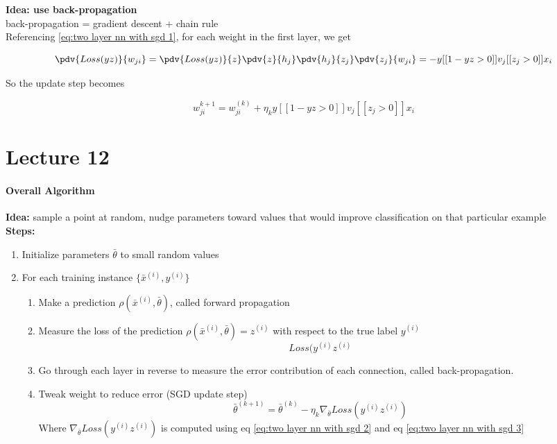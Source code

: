 \documentclass[12pt]{article}
\begin{document}
\textbf{Idea: use back-propagation}\\
back-propagation = gradient descent + chain rule\\

Referencing \ref{eq:two layer nn with sgd 1}, for each weight in the first layer, we get

\begin{equation}
	\pdv{Loss(yz)}{w_{ji}} = \pdv{Loss(yz)}{z} \pdv{z}{h_j} \pdv{h_j}{z_j} \pdv{z_j}{w_{ji}} = -y[[1-yz > 0]] v_j [[z_j > 0]] x_i	\label{eq:two layer nn with sgd 3}
\end{equation}

So the update step becomes

\begin{equation}
	w_{ji}^{k+1} = w_{ji}^{(k)} + \eta_k y[[1-yz > 0]] v_j [[z_j > 0]] x_i
	\label{eq:two layer nn with sgd 4}
\end{equation}

\part{Lecture 12}

\subsection{Overall Algorithm}

\textbf{Idea:} sample a point at random, nudge parameters toward values that would improve classification on that particular example\\

\textbf{Steps:}

\begin{enumerate}
	\item Initialize parameters $\bar{\theta}$ to small random values
	\item For each training instance $\{ \bar x^{(i)}, y^{(i)} \}$
		\begin{enumerate}
			\item Make a prediction $\rho(\bar x^{(i)}, \bar{\theta})$, called forward propagation
			\item Measure the loss of the prediction $\rho(\bar x^{(i)}, \bar{\theta}) = z^{(i)}$ with respect to the true label $y^{(i)}$ 
				\[ Loss(y^{(i)} z^{(i)} \]
			\item Go through each layer in reverse to measure the error contribution of each connection, called back-propagation. 
			\item Tweak weight to reduce error (SGD update step)
				\[ \bar{\theta}^{(k+1)} = \bar{\theta}^{(k)} - \eta_k \nabla_{\bar{\theta}} Loss(y^{(i)} z^{(i)}) \]
				Where $\nabla_{\bar{\theta}} Loss(y^{(i)} z^{(i)})$ is computed using eq \ref{eq:two layer nn with sgd 2} and eq \ref{eq:two layer nn with sgd 3}
		\end{enumerate}
\end{enumerate}
\end{document}
